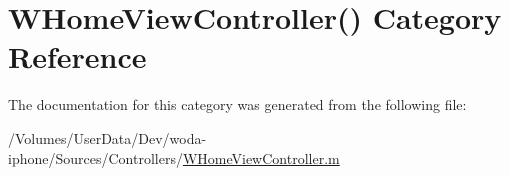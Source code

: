 \hypertarget{category_w_home_view_controller_07_08}{\section{W\-Home\-View\-Controller() Category Reference}
\label{category_w_home_view_controller_07_08}
}


The documentation for this category was generated from the following file\-:\begin{DoxyCompactItemize}
\item 
/\-Volumes/\-User\-Data/\-Dev/woda-\/iphone/\-Sources/\-Controllers/\hyperlink{_w_home_view_controller_8m}{W\-Home\-View\-Controller.\-m}\end{DoxyCompactItemize}
